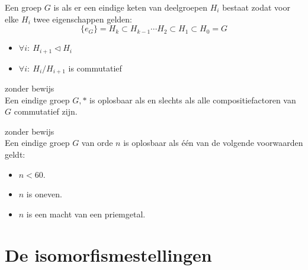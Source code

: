 \documentclass[main.tex]{subfiles}
\begin{document}
\begin{de}
  Een groep $G$ is  als er een eindige keten van deelgroepen $H_{i}$ bestaat zodat voor elke $H_{i}$ twee eigenschappen gelden:
  \[ \{e_{G}\} = H_{k} \subset H_{k-1} \dotsb H_{2} \subset H_{1} \subset H_{0} = G \]
  \begin{itemize}
  \item $\forall i:\ H_{i+1} \triangleleft H_{i}$
  \item $\forall i:\ H_{i}/H_{i+1}$ is commutatief
  \end{itemize}
\end{de}

\begin{st}
  zonder bewijs\\
  Een eindige groep $G,*$ is oplosbaar als en slechts als alle compositiefactoren van $G$ commutatief zijn.
\end{st}

\begin{st}
  zonder bewijs\\
  Een eindige groep $G$ van orde $n$ is oplosbaar als \'e\'en van de volgende voorwaarden geldt:
  \begin{itemize}
  \item $n < 60$.
  \item $n$ is oneven.
  \item $n$ is een macht van een priemgetal.
  \end{itemize}
\end{st}

\section{De isomorfismestellingen}
\label{sec:isomorfismestellingen}
\end{document}
